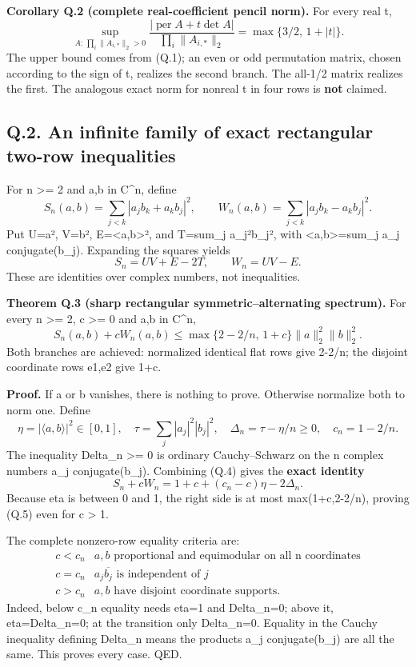\documentclass[
  11pt,
]{article}
\begin{document}
\textbf{Corollary Q.2 (complete real-coefficient pencil norm).} For
every real t, \[
\boxed{\sup_{A:\,\prod_i\|A_{i,*}\|_2>0}
\frac{|\operatorname{per}A+t\det A|}
{\prod_i\|A_{i,*}\|_2}
=\max\{3/2,\,1+|t|\}.}\tag{Q.2}
\] The upper bound comes from (Q.1); an even or odd permutation matrix,
chosen according to the sign of t, realizes the second branch. The
all-1/2 matrix realizes the first. The analogous exact norm for nonreal
t in four rows is \textbf{not} claimed.

\subsection{Q.2. An infinite family of exact rectangular two-row
inequalities}\label{q.2.-an-infinite-family-of-exact-rectangular-two-row-inequalities}

For n \textgreater= 2 and a,b in C\^{}n, define \[
S_n(a,b)=\sum_{j<k}|a_jb_k+a_kb_j|^2,\qquad
W_n(a,b)=\sum_{j<k}|a_jb_k-a_kb_j|^2.\tag{Q.3}
\] Put U=\textbar\textbar a\textbar\textbar²,
V=\textbar\textbar b\textbar\textbar²,
E=\textbar\textless a,b\textgreater\textbar², and T=sum\_j
\textbar a\_j\textbar²\textbar b\_j\textbar², with
\textless a,b\textgreater=sum\_j a\_j conjugate(b\_j). Expanding the
squares yields \[
\boxed{S_n=UV+E-2T,\qquad W_n=UV-E.}\tag{Q.4}
\] These are identities over complex numbers, not inequalities.

\textbf{Theorem Q.3 (sharp rectangular symmetric--alternating
spectrum).} For every n \textgreater= 2, c \textgreater= 0 and a,b in
C\^{}n, \[
\boxed{
S_n(a,b)+cW_n(a,b)
\le\max\{2-2/n,\,1+c\}\|a\|_2^2\|b\|_2^2.
}\tag{Q.5}
\] Both branches are achieved: normalized identical flat rows give
2-2/n; the disjoint coordinate rows e1,e2 give 1+c.

\textbf{Proof.} If a or b vanishes, there is nothing to prove. Otherwise
normalize both to norm one. Define \[
\eta=|\langle a,b\rangle|^2\in[0,1],\quad
\tau=\sum_j|a_j|^2|b_j|^2,\quad
\Delta_n=\tau-\eta/n\ge0,\quad c_n=1-2/n.
\] The inequality Delta\_n \textgreater= 0 is ordinary Cauchy--Schwarz
on the n complex numbers a\_j conjugate(b\_j). Combining (Q.4) gives the
\textbf{exact identity} \[
\boxed{
S_n+cW_n=1+c+(c_n-c)\eta-2\Delta_n.
}\tag{Q.6}
\] Because eta is between 0 and 1, the right side is at most
max(1+c,2-2/n), proving (Q.5) even for c \textgreater{} 1.

The complete nonzero-row equality criteria are: \[
\begin{array}{c|l}
c<c_n& a,b \text{ proportional and equimodular on all n coordinates}\\
c=c_n& a_j\overline{b_j}\text{ is independent of }j\\
c>c_n& a,b \text{ have disjoint coordinate supports}.
\end{array}\tag{Q.7}
\] Indeed, below c\_n equality needs eta=1 and Delta\_n=0; above it,
eta=Delta\_n=0; at the transition only Delta\_n=0. Equality in the
Cauchy inequality defining Delta\_n means the products a\_j
conjugate(b\_j) are all the same. This proves every case. QED.
\end{document}

